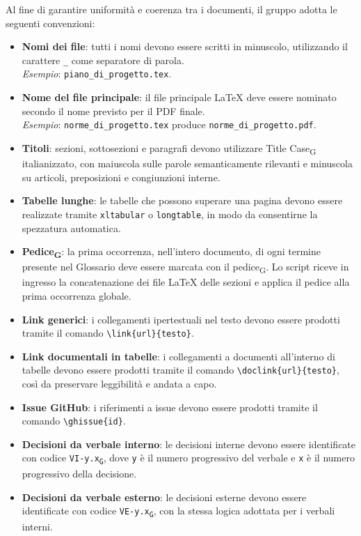 Al fine di garantire uniformità e coerenza tra i documenti, il gruppo adotta le
seguenti convenzioni:

\begin{itemize}
    \item \textbf{Nomi dei file}: tutti i nomi devono essere scritti in minuscolo,
    utilizzando il carattere \texttt{\_} come separatore di parola.
    \\
    \textit{Esempio}: \texttt{piano\_di\_progetto.tex}.

    \item \textbf{Nome del file principale}: il file principale \LaTeX{} deve essere
    nominato secondo il nome previsto per il PDF finale.
    \\
    \textit{Esempio}: \texttt{norme\_di\_progetto.tex} produce
    \texttt{norme\_di\_progetto.pdf}.

    \item \textbf{Titoli}: sezioni, sottosezioni e paragrafi devono utilizzare
    Title Case\textsubscript{G} italianizzato, con maiuscola sulle parole semanticamente
    rilevanti e minuscola su articoli, preposizioni e congiunzioni interne.

    \item \textbf{Tabelle lunghe}: le tabelle che possono superare una pagina devono
    essere realizzate tramite \texttt{xltabular} o \texttt{longtable}, in modo da
    consentirne la spezzatura automatica.

    \item \textbf{Pedice\textsubscript{G}}: la prima occorrenza, nell'intero documento, di ogni
    termine presente nel Glossario deve essere marcata con il pedice\textsubscript{G}. Lo script riceve in ingresso la concatenazione dei file
    \LaTeX{} delle sezioni e applica il pedice alla prima occorrenza globale.

    \item \textbf{Link generici}: i collegamenti ipertestuali nel testo devono essere
    prodotti tramite il comando \verb|\link{url}{testo}|.

    \item \textbf{Link documentali in tabelle}: i collegamenti a documenti all'interno
    di tabelle devono essere prodotti tramite il comando
    \verb|\doclink{url}{testo}|, così da preservare leggibilità e andata a capo.

    \item \textbf{Issue GitHub}: i riferimenti a issue devono essere prodotti tramite
    il comando \verb|\ghissue{id}|.

    \item \textbf{Decisioni da verbale interno}: le decisioni interne devono essere
    identificate con codice \texttt{VI-y.x\textsubscript{G}}, dove \texttt{y} è il numero progressivo
    del verbale e \texttt{x} è il numero progressivo della decisione.

    \item \textbf{Decisioni da verbale esterno}: le decisioni esterne devono essere
    identificate con codice \texttt{VE-y.x\textsubscript{G}}, con la stessa logica adottata per i
    verbali interni.
\end{itemize}

